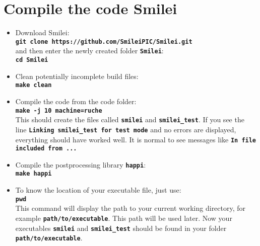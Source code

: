 \documentclass{article}
\newcommand{\smilei}{{\sc Smilei}\xspace}
\newcommand{\commandline}[1]{\texttt{\textbf{#1}}}
\begin{document}
\section{Compile the code \smilei}
\begin{itemize}
\item Download \smilei:\\
\commandline{git clone https://github.com/SmileiPIC/Smilei.git}\\
and then enter the newly created folder \commandline{Smilei}:\\
\commandline{cd Smilei}

\item Clean potentially incomplete build files:\\
\commandline{make clean}

\item Compile the code from the code folder:\\
\commandline{make -j 10 machine=ruche}\\
This should create the files called \commandline{smilei} and \commandline{smilei\_test}.
If you see the line \commandline{Linking smilei\_test for test mode} and no errors are displayed, everything should have worked well.
It is normal to see messages like \commandline{In file included from ...}

\item Compile the postprocessing library \commandline{happi}:\\
\commandline{make happi}

\item To know the location of your executable file, just use:\\
\commandline{pwd}\\
This command will display the path to your current working directory,  for example \commandline{path/to/executable}. This path will be used later. Now your executables \commandline{smilei} and \commandline{smilei\_test} should be found in your folder \commandline{path/to/executable}.

\end{itemize}
\end{document}
